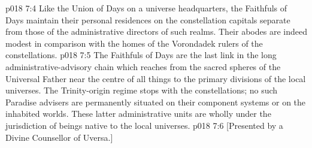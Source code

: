 \vs p018 7:4 Like the Union of Days on a universe headquarters, the Faithfuls of Days maintain their personal residences on the constellation capitals separate from those of the administrative directors of such realms. Their abodes are indeed modest in comparison with the homes of the Vorondadek rulers of the constellations.
\vs p018 7:5 The Faithfuls of Days are the last link in the long administrative\hyp{}advisory chain which reaches from the sacred spheres of the Universal Father near the centre of all things to the primary divisions of the local universes. The Trinity\hyp{}origin regime stops with the constellations; no such Paradise advisers are permanently situated on their component systems or on the inhabited worlds. These latter administrative units are wholly under the jurisdiction of beings native to the local universes.
\vsetoff
\vs p018 7:6 [Presented by a Divine Counsellor of Uversa.]
